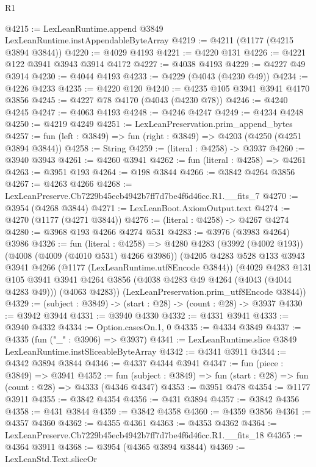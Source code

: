 \begin{lexlean}{R1}
\begin{coremodule}
@4215 := LexLeanRuntime.append @3849 LexLeanRuntime.instAppendableByteArray
@4219 := @4211 (@1177 (@4215 @3894 @3844))
@4220 := @4029 @4193
@4221 := @4220 @131
@4226 := @4221 @122 @3941 @3943 @3914 @4172
@4227 := @4038 @4193
@4229 := @4227 @49 @3914
@4230 := @4044 @4193
@4233 := @4229 (@4043 (@4230 @49))
@4234 := @4226 @4233
@4235 := @4220 @120
@4240 := @4235 @105 @3941 @3941 @4170 @3856
@4245 := @4227 @78 @4170 (@4043 (@4230 @78))
@4246 := @4240 @4245
@4247 := @4063 @4193
@4248 := @4246 @4247
@4249 := @4234 @4248
@4250 := @4219 @4249
@4251 := LexLeanPreservation.prim_append_bytes
@4257 := fun (left : @3849) => fun (right : @3849) => @4203 (@4250 (@4251 @3894 @3844))
@4258 := String
@4259 := (literal : @4258) -> @3937
@4260 := @3940 @3943
@4261 := @4260 @3941
@4262 := fun (literal : @4258) => @4261
@4263 := @3951 @193
@4264 := @198 @3844
@4266 := @3842 @4264 @3856
@4267 := @4263 @4266
@4268 := LexLeanPreserve.Cb7229b45ecb4942b7ff7d7be4f6d46cc.R1.__fits_7
@4270 := @3954 (@4268 @3844)
@4271 := LexLeanBoot.AxiomOutput.text
@4274 := @4270 (@1177 (@4271 @3844))
@4276 := (literal : @4258) -> @4267 @4274
@4280 := @3968 @193 @4266 @4274 @531
@4283 := @3976 (@3983 @4264) @3986
@4326 := fun (literal : @4258) =>
  @4280
    @4283
    (@3992 (@4002 @193))
    (@4008 (@4009 (@4010 @531) @4266 @3986))
    (@4205
      @4283
      @528
      @133
      @3943
      @3941
      @4266
      (@1177 (LexLeanRuntime.utf8Encode @3844))
      (@4029
        @4283
        @131
        @105
        @3941
        @3941
        @4264
        @3856
        (@4038 @4283 @49 @4264 (@4043 (@4044 @4283 @49)))
        (@4063 @4283))
      (LexLeanPreservation.prim_utf8Encode @3844))
@4329 := (subject : @3849) -> (start : @28) -> (count : @28) -> @3937
@4330 := @3942 @3944
@4331 := @3940 @4330
@4332 := @4331 @3941
@4333 := @3940 @4332
@4334 := Option.casesOn.{1, 0}
@4335 := @4334 @3849
@4337 := @4335 (fun ("_" : @3906) => @3937)
@4341 := LexLeanRuntime.slice @3849 LexLeanRuntime.instSliceableByteArray
@4342 := @4341 @3911
@4344 := @4342 @3894 @3844
@4346 := @4337 @4344 @3941
@4347 := fun (piece : @3849) => @3941
@4352 := fun (subject : @3849) => fun (start : @28) => fun (count : @28) => @4333 (@4346 @4347)
@4353 := @3951 @478
@4354 := @1177 @3911
@4355 := @3842 @4354
@4356 := @431 @3894
@4357 := @3842 @4356
@4358 := @431 @3844
@4359 := @3842 @4358
@4360 := @4359 @3856
@4361 := @4357 @4360
@4362 := @4355 @4361
@4363 := @4353 @4362
@4364 := LexLeanPreserve.Cb7229b45ecb4942b7ff7d7be4f6d46cc.R1.__fits_18
@4365 := @4364 @3911
@4368 := @3954 (@4365 @3894 @3844)
@4369 := LexLeanStd.Text.sliceOr

\end{coremodule}
\end{lexlean}
